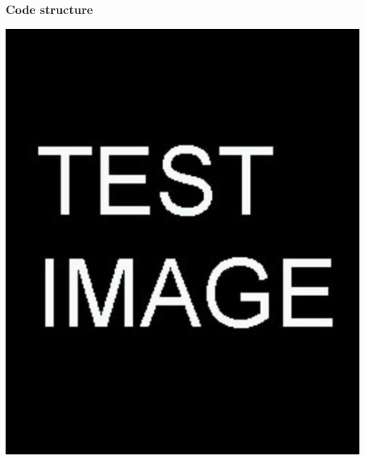 \documentclass{beamer}
\begin{document}
\begin{frame} %
	\frametitle{Code structure}
	\includegraphics[scale=0.2]{etc/test.jpg}
\end{frame}
\end{document}
